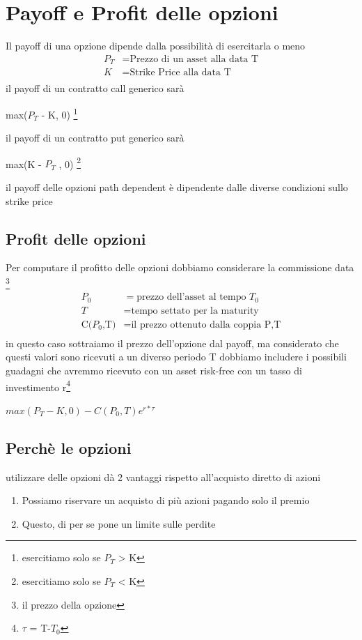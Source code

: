 \documentclass[a4paper,11pt]{report}
\begin{document}
{\section{Payoff e Profit delle opzioni}
	Il payoff di una opzione dipende dalla possibilità di esercitarla o meno
\begin{align*}
	\text{$P_T$} &= \text{Prezzo di un asset alla data T} \\
	K &= \text{Strike Price alla data T} \\
\end{align*}
	il payoff di un contratto call generico sarà
\begin{center}	
	max($P_T$ - K, 0) \footnote{ esercitiamo solo se $P_T$ > K}
\end {center}
	il payoff di un contratto put generico sarà
\begin{center}	
	max(K - $P_T$ , 0) \footnote {esercitiamo solo se $P_T$ < K}
\end {center}
	il payoff delle opzioni path dependent è dipendente dalle diverse condizioni sullo strike price \newline
\subsection {Profit delle opzioni}
	Per computare il profitto delle opzioni dobbiamo considerare la commissione data \footnote{il prezzo della opzione}
\begin{align*}
	\text{$P_0$} &= \text{prezzo dell'asset al tempo $T_0$} \\
	T &= \text{tempo settato per la maturity} \\
	\text{C($P_0$,T)} &= \text{il prezzo ottenuto dalla coppia P,T}\\
\end{align*}
in questo caso sottraiamo il prezzo dell'opzione dal payoff, ma considerato che questi valori sono ricevuti a un diverso periodo T dobbiamo includere i possibili guadagni che avremmo ricevuto con un asset risk-free con un tasso di investimento r\footnote{ $\tau$ = T-$T_0$} \newline

\begin{center}
	$max(P_T - K, 0) - C(P_0,T)e^{r*\tau}$
\end{center}
\subsection{Perchè le opzioni}
	utilizzare delle opzioni dà 2 vantaggi rispetto all'acquisto diretto di azioni
\begin{enumerate}
	\item Possiamo riservare un acquisto di più azioni pagando solo il premio
	\item Questo, di per se pone un limite sulle perdite
\end{enumerate}
}
\end{document}
